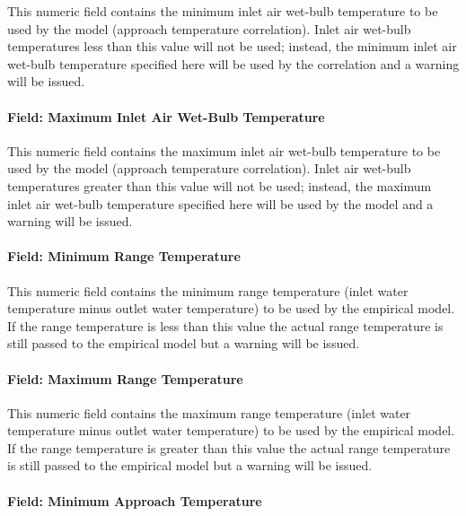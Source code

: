 This numeric field contains the minimum inlet air wet-bulb temperature to be used by the model (approach temperature correlation). Inlet air wet-bulb temperatures less than this value will not be used; instead, the minimum inlet air wet-bulb temperature specified here will be used by the correlation and a warning will be issued.

\paragraph{Field: Maximum Inlet Air Wet-Bulb Temperature}\label{field-maximum-inlet-air-wet-bulb-temperature-1}

This numeric field contains the maximum inlet air wet-bulb temperature to be used by the model (approach temperature correlation). Inlet air wet-bulb temperatures greater than this value will not be used; instead, the maximum inlet air wet-bulb temperature specified here will be used by the model and a warning will be issued.

\paragraph{Field: Minimum Range Temperature}\label{field-minimum-range-temperature-1}

This numeric field contains the minimum range temperature (inlet water temperature minus outlet water temperature) to be used by the empirical model. If the range temperature is less than this value the actual range temperature is still passed to the empirical model but a warning will be issued.

\paragraph{Field: Maximum Range Temperature}\label{field-maximum-range-temperature-1}

This numeric field contains the maximum range temperature (inlet water temperature minus outlet water temperature) to be used by the empirical model. If the range temperature is greater than this value the actual range temperature is still passed to the empirical model but a warning will be issued.

\paragraph{Field: Minimum Approach Temperature}\label{field-minimum-approach-temperature-1}

